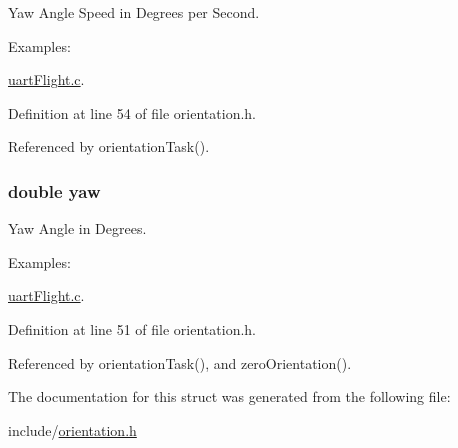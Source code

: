 Yaw Angle Speed in Degrees per Second. 

\begin{Desc}
\item[Examples\-: ]\par
\hyperlink{uart_flight_8c-example}{uart\-Flight.\-c}.\end{Desc}


Definition at line 54 of file orientation.\-h.



Referenced by orientation\-Task().

\hypertarget{struct_angles_a21cd490f6191f66678f55b4c242a10cf}{
\subsubsection[{yaw}]{\setlength{\rightskip}{0pt plus 5cm}double yaw}}\label{struct_angles_a21cd490f6191f66678f55b4c242a10cf}


Yaw Angle in Degrees. 

\begin{Desc}
\item[Examples\-: ]\par
\hyperlink{uart_flight_8c-example}{uart\-Flight.\-c}.\end{Desc}


Definition at line 51 of file orientation.\-h.



Referenced by orientation\-Task(), and zero\-Orientation().



The documentation for this struct was generated from the following file\-:\begin{DoxyCompactItemize}
\item 
include/\hyperlink{orientation_8h}{orientation.\-h}\end{DoxyCompactItemize}
